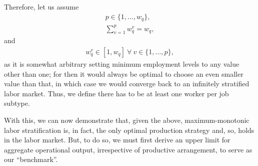 \documentclass[hidelinks, nonatbib]{elsarticle}
\begin{document}
\begin{axiom}
    Therefore, let us assume
    \begin{gather}
    p \in \{1, \dots, w_q\}
    ,
    \\
    \sum_{v=1}^{p}
    w_{q}^{v}
    =
    w_q
    ,
    \end{gather}
    and
    \begin{gather}
    w_{q}^{v} 
    \in 
    [1, w_q]
    \
    \forall
    \
    v \in \{1, \dots, p\}
    ,
    \end{gather}
    as it is somewhat arbitrary setting minimum employment levels to any value other than one; for then it would always be optimal to choose an even smaller value than that, in which case we would converge back to an infinitely stratified labor market. Thus, we define there has to be at least one worker per job subtype.
\end{axiom}

With this, we can now demonstrate that, given the above, maximum-monotonic labor stratification is, in fact, the only optimal production strategy and, so, holds in the labor market. But, to do so, we must first derive an upper limit for aggregate operational output, irrespective of productive arrangement, to serve as our ``benchmark''.
\end{document}
